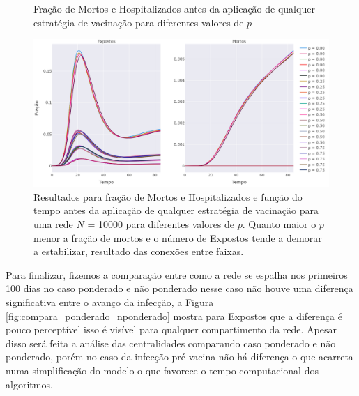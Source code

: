 \begin{figure}[H]
    \centering
    \captionsetup{font=normalsize,skip=0.8pt,singlelinecheck=on,labelsep=endash}
    \caption{Fração de Mortos e Hospitalizados antes da aplicação de qualquer estratégia de vacinação para diferentes valores de $p$}
    \vspace{5pt}
    \includegraphics[width=\textwidth]{figuras/pre_vacina_mortos_p_nponderado.png}
    \captionsetup{font=small,justification=justified}
    \caption*{Resultados para fração de Mortos e Hospitalizados e função do tempo antes da aplicação de qualquer estratégia de vacinação para uma rede $N$ = 10000 para diferentes valores de $p$. Quanto maior o $p$ menor a fração de mortos e o número de Expostos tende a demorar a estabilizar, resultado das conexões entre faixas.}
    \label{fig:pre_vacina_mortos_p}
\end{figure}

Para finalizar, fizemos a comparação entre como a rede se espalha nos primeiros 100 dias no caso ponderado e não ponderado nesse caso  não houve uma diferença significativa entre o avanço da infecção, a Figura \ref{fig:compara_ponderado_nponderado} mostra para Expostos que a diferença é pouco perceptível isso é visível para qualquer compartimento da rede. Apesar disso será feita a análise das centralidades comparando caso ponderado e não ponderado, porém no caso da infecção pré-vacina não há diferença o que acarreta numa simplificação do modelo o que favorece o tempo computacional dos algoritmos.

